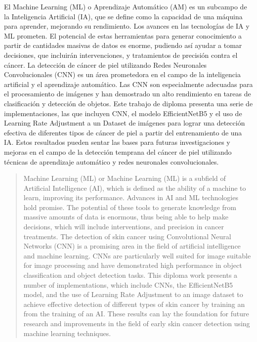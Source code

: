 \begin{resumen}
	El Machine Learning (ML) o Aprendizaje Automático (AM) es un subcampo de la Inteligencia Artificial (IA),
que se define como la capacidad de una máquina para aprender, mejorando su rendimiento. Los avances en
las tecnologías de IA y ML prometen. El potencial de estas herramientas para generar conocimiento a partir de cantidades masivas
de datos es enorme, pudiendo así ayudar a tomar decisiones, que incluirán intervenciones, y tratamientos
de precisión contra el cáncer. La detección de cáncer de piel utilizando Redes Neuronales Convolucionales (CNN) 
es un área prometedora en el campo de la inteligencia artificial y el aprendizaje automático. Las CNN son especialmente
adecuadas para el procesamiento de imágenes y han demostrado un alto rendimiento en tareas de clasificación y detección
de objetos. Este trabajo de diploma presenta una serie de implementaciones, las que incluyen CNN, el modelo EfficientNetB5 
y el uso de Learning Rate Adjustment a un Dataset de imágenes para lograr una detección efectiva de diferentes tipos de cáncer 
de piel a partir del entrenamiento de una IA. Estos resultados pueden sentar las bases para futuras investigaciones y mejoras 
en el campo de la detección temprana del cáncer de piel utilizando técnicas de aprendizaje automático y 
redes neuronales convolucionales.
\end{resumen}

\begin{abstract}
	Machine Learning (ML) or Machine Learning (ML) is a subfield of Artificial Intelligence (AI), which is defined 
as the ability of a machine to learn, improving its performance. Advances in AI and ML technologies hold promise. 
The potential of these tools to generate knowledge from massive amounts of data is enormous, thus being able to help 
make decisions, which will include interventions, and precision in cancer treatments. The detection of skin cancer using 
Convolutional Neural Networks (CNN)  is a promising area in the field of artificial intelligence and machine learning. 
CNNs are particularly well suited for image suitable for image processing and have demonstrated high performance in object 
classification and object detection tasks. This diploma work presents a number of implementations, which 
include CNNs, the EfficientNetB5 model, and the use of Learning Rate Adjustment to an image dataset to achieve 
effective detection of different types of skin cancer by training an from the training of an AI. These results can lay 
the foundation for future research and improvements in the field of early skin cancer detection using machine learning 
techniques.
\end{abstract}